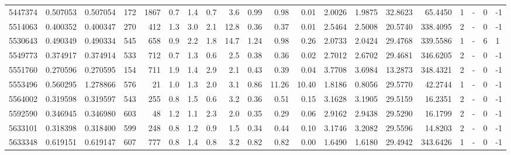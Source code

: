 \begin{tabular}{rrrrrrrrrrrrrrrrrlrl}
   5447374 & 0.507053 &   0.507054 &  172 & 1867 &      0.7 &      1.4 &     0.7 &      3.6 &       0.99 &        0.98 &        0.01 &  2.0026 &  1.9875 &   32.8623 &   65.4450 &       1 &             - &        0 &        -1 \\
   5514063 & 0.400352 &   0.400347 &  270 &  412 &      1.3 &      3.0 &     2.1 &     12.8 &       0.36 &        0.37 &        0.01 &  2.5464 &  2.5008 &   20.5740 &  338.4095 &       2 &             - &        0 &        -1 \\
   5530643 & 0.490349 &   0.490334 &  545 &  658 &      0.9 &      2.2 &     1.8 &     14.7 &       1.24 &        0.98 &        0.26 &  2.0733 &  2.0424 &   29.4768 &  339.5586 &       1 &             - &        6 &         1 \\
   5549773 & 0.374917 &   0.374914 &  533 &  712 &      0.7 &      1.3 &     0.6 &      2.5 &       0.38 &        0.36 &        0.02 &  2.7012 &  2.6702 &   29.4681 &  346.6205 &       2 &             - &        0 &        -1 \\
   5551760 & 0.270596 &   0.270595 &  154 &  711 &      1.9 &      1.4 &     2.9 &      2.1 &       0.43 &        0.39 &        0.04 &  3.7708 &  3.6984 &   13.2873 &  348.4321 &       2 &             - &        0 &        -1 \\
   5553496 & 0.560295 &   1.278866 &  576 &   21 &      1.0 &      1.3 &     2.0 &      3.1 &       0.86 &       11.26 &       10.40 &  1.8186 &  0.8056 &   29.5770 &   42.2744 &       1 &             - &        0 &        -1 \\
   5564002 & 0.319598 &   0.319597 &  543 &  255 &      0.8 &      1.5 &     0.6 &      3.2 &       0.36 &        0.51 &        0.15 &  3.1628 &  3.1905 &   29.5159 &   16.2351 &       2 &             - &        0 &        -1 \\
   5592590 & 0.346945 &   0.346980 &  603 &   48 &      1.2 &      1.1 &     2.3 &      2.0 &       0.35 &        0.29 &        0.06 &  2.9162 &  2.9438 &   29.5290 &   16.1799 &       2 &             - &        0 &        -1 \\
   5633101 & 0.318398 &   0.318400 &  599 &  248 &      0.8 &      1.2 &     0.9 &      1.5 &       0.34 &        0.44 &        0.10 &  3.1746 &  3.2082 &   29.5596 &   14.8203 &       2 &             - &        0 &        -1 \\
   5633348 & 0.619151 &   0.619147 &  607 &  777 &      0.8 &      1.4 &     0.8 &      3.2 &       0.82 &        0.82 &        0.00 &  1.6490 &  1.6180 &   29.4942 &  343.6426 &       1 &             - &        0 &        -1 \\

\end{tabular}
